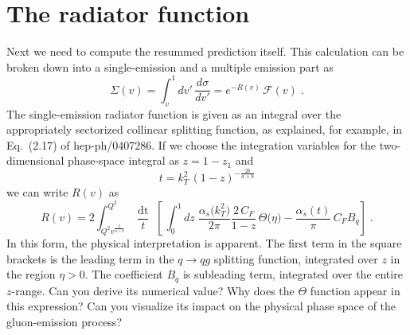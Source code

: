 \documentclass[10pt,fleqn]{scrartcl}
\begin{document}
\section{The radiator function}
Next we need to compute the resummed prediction itself. This calculation
can be broken down into a single-emission and a multiple emission part as
\begin{equation}\label{eq:spectrum}
  \Sigma(v)=\int_v^1 dv'\,\frac{d\sigma}{dv'}=e^{-R(v)}\,\mathcal{F}(v)\;.
\end{equation}
The single-emission radiator function is given as an integral over the
appropriately sectorized collinear splitting function, as explained, for example,
in Eq.~(2.17) of hep-ph/0407286.
If we choose the integration variables for the two-dimensional phase-space integral
as $z=1-z_1$ and
\begin{equation}
  t=k_T^2\,(1-z)^{-\frac{2b}{a+b}}
\end{equation}
we can write $R(v)$ as
\begin{equation}\label{eq:single_emission_nll}
  R(v) = 2\int_{Q^2v^\frac{2}{a+b}}^{Q^2} \frac{\mathop{dt}}{t}\; 
  \left[\,\int_0^1 dz\;
    \frac{\alpha_s\big(k_T^2\big)}{2\pi}\frac{2\,C_F}{1-z}\,\Theta\big(\eta\big)
    -\frac{\alpha_s(t)}{\pi}\,C_FB_q\right]\;.
\end{equation}
In this form, the physical interpretation is apparent. The first term in the 
square brackets is the leading term in the $q\to qg$ splitting function,
integrated over $z$ in the region $\eta>0$. The coefficient $B_q$ is subleading term,
integrated over the entire $z$-range. Can you derive its numerical value?
Why does the $\Theta$ function appear in this expression? Can you visualize
its impact on the physical phase space of the gluon-emission process?
\end{document}
